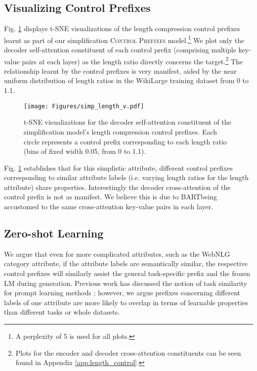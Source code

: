 \documentclass[11pt]{article}
\newcommand{\control}{\textsc{Control Prefixes}\xspace}
\newcommand{\bartl}{BART}
\begin{document}
\subsection{Visualizing Control Prefixes}
\label{sec:visual}
Fig. \ref{fig:tsne} displays t-SNE \citep{tsne_orig} visualizations of the length compression control prefixes learnt as part of our simplification \control model.\footnote{A perplexity of 5 is used for all plots.} We plot only the decoder self-attention constituent of each control prefix (comprising multiple key-value pairs at each layer) as the length ratio directly concerns the target.\footnote{Plots for the encoder and decoder cross-attention constituents can be seen found in Appendix \ref{app:length_control}.} The relationship learnt by the control prefixes is very manifest, aided by the near uniform distribution of length ratios in the WikiLarge training dataset from 0 to 1.1. 

\begin{figure}[ht!]
    \centering
            
    \texttt{[image: Figures/simp\_length\_v.pdf]}
    
    \caption{t-SNE visualizations for the decoder self-attention constituent of the simplification model's length compression control prefixes. Each circle represents a control prefix corresponding to each length ratio (bins of fixed width 0.05, from 0 to 1.1). \label{fig:tsne}
    }
\end{figure}


Fig. \ref{fig:tsne} establishes that for this simplistic attribute, different control prefixes corresponding to similar attribute labels (i.e. varying length ratios for the length attribute) share properties. Interestingly the decoder cross-attention of the control prefix is not as manifest. We believe this is due to \bartl being accustomed to the same cross-attention key-value pairs in each layer.


\subsection{Zero-shot Learning}
\label{sec:zero}
We argue that even for more complicated attributes, such as the WebNLG category attribute, if the attribute labels are semantically similar, the respective control prefixes will similarly assist the general task-specific prefix and the frozen LM during generation. 
Previous work has discussed the notion of task similarity \citep{achille} for prompt learning methods \citep{lester}; however, we argue prefixes concerning different labels of one attribute are more likely to overlap in terms of learnable properties than different tasks or whole datasets. 
\end{document}
